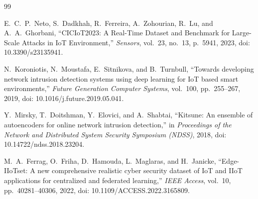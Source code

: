 \documentclass[12pt,a4paper]{report}
\begin{document}
\begin{thebibliography}{99}

E.~C.~P.~Neto, S.~Dadkhah, R.~Ferreira, A.~Zohourian, R.~Lu, and A.~A.~Ghorbani, ``CICIoT2023: A Real-Time Dataset and Benchmark for Large-Scale Attacks in IoT Environment,'' \emph{Sensors}, vol.~23, no.~13, p.~5941, 2023, doi: 10.3390/s23135941.

N.~Koroniotis, N.~Moustafa, E.~Sitnikova, and B.~Turnbull, ``Towards developing network intrusion detection systems using deep learning for IoT based smart environments,'' \emph{Future Generation Computer Systems}, vol.~100, pp.~255--267, 2019, doi: 10.1016/j.future.2019.05.041.

Y.~Mirsky, T.~Doitshman, Y.~Elovici, and A.~Shabtai, ``Kitsune: An ensemble of autoencoders for online network intrusion detection,'' in \emph{Proceedings of the Network and Distributed System Security Symposium (NDSS)}, 2018, doi: 10.14722/ndss.2018.23204.

M.~A.~Ferrag, O.~Friha, D.~Hamouda, L.~Maglaras, and H.~Janicke, ``Edge-IIoTset: A new comprehensive realistic cyber security dataset of IoT and IIoT applications for centralized and federated learning,'' \emph{IEEE Access}, vol.~10, pp.~40281--40306, 2022, doi: 10.1109/ACCESS.2022.3165809.

\end{thebibliography}
\end{document}
